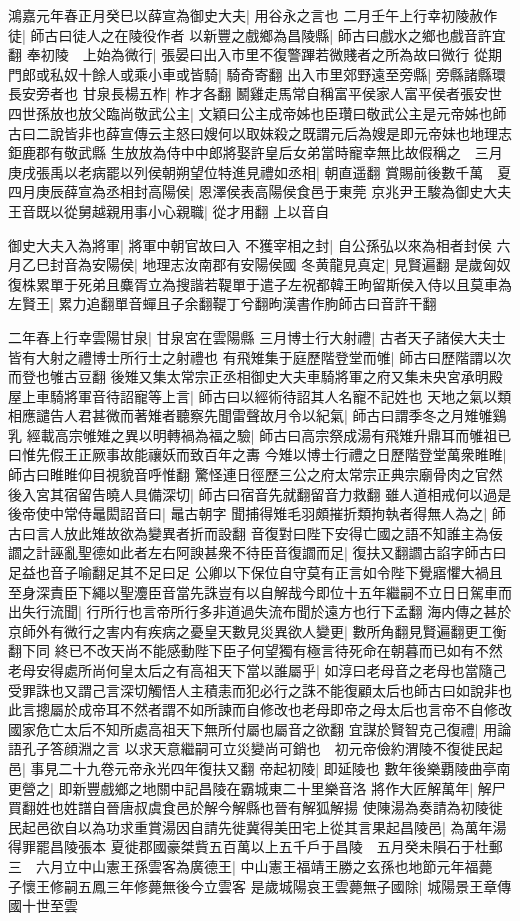 鴻嘉元年春正月癸巳以薛宣為御史大夫|{
	用谷永之言也}
二月壬午上行幸初陵赦作徒|{
	師古曰徒人之在陵役作者}
以新豐之戲鄉為昌陵縣|{
	師古曰戲水之鄉也戲音許宜翻}
奉初陵　上始為微行|{
	張晏曰出入市里不復警蹕若微賤者之所為故曰微行}
從期門郎或私奴十餘人或乘小車或皆騎|{
	騎奇寄翻}
出入市里郊野遠至旁縣|{
	旁縣諸縣環長安旁者也}
甘泉長楊五柞|{
	柞才各翻}
鬭雞走馬常自稱富平侯家人富平侯者張安世四世孫放也放父臨尚敬武公主|{
	文穎曰公主成帝姊也臣瓚曰敬武公主是元帝姊也師古曰二說皆非也薛宣傳云主怒曰嫂何以取妺殺之既謂元后為嫂是即元帝妹也地理志鉅鹿郡有敬武縣}
生放放為侍中中郎將娶許皇后女弟當時寵幸無比故假稱之　三月庚戌張禹以老病罷以列侯朝朔望位特進見禮如丞相|{
	朝直遥翻}
賞賜前後數千萬　夏四月庚辰薛宣為丞相封高陽侯|{
	恩澤侯表高陽侯食邑于東莞}
京兆尹王駿為御史大夫王音既以從舅越親用事小心親職|{
	從才用翻}
上以音自

御史大夫入為將軍|{
	將軍中朝官故曰入}
不獲宰相之封|{
	自公孫弘以來為相者封侯}
六月乙巳封音為安陽侯|{
	地理志汝南郡有安陽侯國}
冬黄龍見真定|{
	見賢遍翻}
是歲匈奴復株累單于死弟且麋胥立為搜諧若鞮單于遣子左祝都韓王昫留斯侯入侍以且莫車為左賢王|{
	累力追翻單音蟬且子余翻鞮丁兮翻昫漢書作胊師古曰音許干翻}


二年春上行幸雲陽甘泉|{
	甘泉宮在雲陽縣}
三月博士行大射禮|{
	古者天子諸侯大夫士皆有大射之禮博士所行士之射禮也}
有飛雉集于庭歷階登堂而雊|{
	師古曰歷階謂以次而登也雊古豆翻}
後雉又集太常宗正丞相御史大夫車騎將軍之府又集未央宮承明殿屋上車騎將軍音待詔寵等上言|{
	師古曰以經術待詔其人名寵不記姓也}
天地之氣以類相應譴告人君甚微而著雉者聽察先聞雷聲故月令以紀氣|{
	師古曰謂季冬之月雉雊鷄乳}
經載高宗雊雉之異以明轉禍為福之驗|{
	師古曰高宗祭成湯有飛雉升鼎耳而雊祖已曰惟先假王正厥事故能禳妖而致百年之夀}
今雉以博士行禮之日歷階登堂萬衆睢睢|{
	師古曰睢睢仰目視貌音呼惟翻}
驚怪連日徑歷三公之府太常宗正典宗廟骨肉之官然後入宮其宿留告曉人具備深切|{
	師古曰宿音先就翻留音力救翻}
雖人道相戒何以過是後帝使中常侍鼂閎詔音曰|{
	鼂古朝字}
聞捕得雉毛羽頗摧折類拘執者得無人為之|{
	師古曰言人放此雉故欲為變異者折而設翻}
音復對曰陛下安得亡國之語不知誰主為佞讇之計誣亂聖德如此者左右阿諛甚衆不待臣音復讇而足|{
	復扶又翻讇古諂字師古曰足益也音子喻翻足其不足曰足}
公卿以下保位自守莫有正言如令陛下覺寤懼大禍且至身深責臣下繩以聖灋臣音當先誅豈有以自解哉今即位十五年繼嗣不立日日駕車而出失行流聞|{
	行所行也言帝所行多非道過失流布聞於遠方也行下孟翻}
海内傳之甚於京師外有微行之害内有疾病之憂皇天數見災異欲人變更|{
	數所角翻見賢遍翻更工衡翻下同}
終已不改天尚不能感動陛下臣子何望獨有極言待死命在朝暮而已如有不然老母安得處所尚何皇太后之有高祖天下當以誰屬乎|{
	如淳曰老母音之老母也當隨己受罪誅也又謂己言深切觸悟人主積恚而犯必行之誅不能復顧太后也師古曰如說非也此言摠屬於成帝耳不然者謂不如所諫而自修改也老母即帝之母太后也言帝不自修改國家危亡太后不知所處高祖天下無所付屬也屬音之欲翻}
宜謀於賢智克己復禮|{
	用論語孔子答顔淵之言}
以求天意繼嗣可立災變尚可銷也　初元帝儉約渭陵不復徙民起邑|{
	事見二十九卷元帝永光四年復扶又翻}
帝起初陵|{
	即延陵也}
數年後樂覇陵曲亭南更營之|{
	即新豐戲鄉之地關中記昌陵在霸城東二十里樂音洛}
將作大匠解萬年|{
	解尸買翻姓也姓譜自晉唐叔虞食邑於解今解縣也晉有解狐解揚}
使陳湯為奏請為初陵徙民起邑欲自以為功求重賞湯因自請先徙冀得美田宅上從其言果起昌陵邑|{
	為萬年湯得罪罷昌陵張本}
夏徙郡國豪桀貲五百萬以上五千戶于昌陵　五月癸未隕石于杜郵三　六月立中山憲王孫雲客為廣德王|{
	中山憲王福靖王勝之玄孫也地節元年福薨　子懷王修嗣五鳳三年修薨無後今立雲客}
是歲城陽哀王雲薨無子國除|{
	城陽景王章傳國十世至雲}


